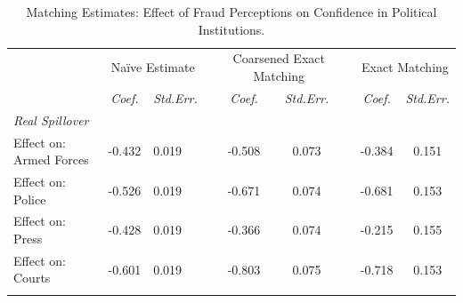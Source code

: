\documentclass[11pt, ngerman,english,a4]{article}
\begin{document}
\begin{table}[]
\caption{Matching Estimates: Effect of Fraud Perceptions on Confidence in Political Institutions.}
\singlespace
\begin{tabular}{llllccccc}
\hline
                              & \multicolumn{2}{c}{Na{\"i}ve Estimate}                                         & \multicolumn{1}{c}{}          & \multicolumn{2}{c}{Coarsened Exact Matching} &                      & \multicolumn{2}{c}{Exact Matching}          \\
                              & \multicolumn{1}{c}{\textit{Coef.}} & \multicolumn{1}{c}{\textit{Std.Err.}} & \multicolumn{1}{c}{\textit{}} & \textit{Coef.}        & \textit{Std.Err.}    & \textit{}            & \textit{Coef.}       & \textit{Std.Err.}    \\ \cline{2-3} \cline{5-6} \cline{8-9} 
\textit{Real Spillover}       &                                    &                                       &                               & \multicolumn{1}{l}{}  & \multicolumn{1}{l}{} & \multicolumn{1}{l}{} & \multicolumn{1}{l}{} & \multicolumn{1}{l}{} \\
Effect on: Armed Forces       & -0.432                             & 0.019                                 &                               & -0.508                & 0.073                &                      & -0.384               & 0.151                \\
Effect on: Police             & -0.526                             & 0.019                                 &                               & -0.671                & 0.074                &                      & -0.681               & 0.153                \\
Effect on: Press              & -0.428                             & 0.019                                 &                               & -0.366                & 0.074                &                      & -0.215               & 0.155                \\
Effect on: Courts             & -0.601                             & 0.019                                 &                               & -0.803                & 0.075                &                      & -0.718               & 0.153                \\
                              &                                    &                                       &                               &                       &                      &                      &                      &                      \\

\end{tabular}
\end{table}
\end{document}
